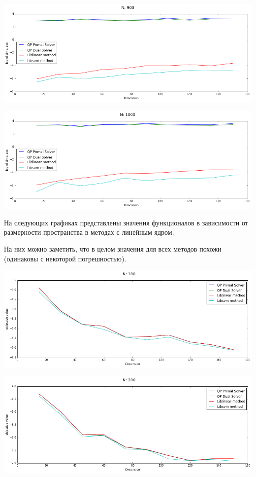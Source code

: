 \documentclass[12pt, a4paper]{article}
\begin{document}
			\begin{center}
				\includegraphics[width=17cm]{1par_N900_one.png}
			\end{center}

			\begin{center}
				\includegraphics[width=17cm]{1par_N1000_one.png}
			\end{center}

			На следующих графиках представлены значения функционалов в зависимости от размерности пространства в методах с линейным ядром.

			На них можно заметить, что в целом значения для всех методов похожи (одинаковы с некоторой погрешностью).

			\begin{center}
				\includegraphics[width=17cm]{1par_obj_N100_one.png}
			\end{center}

			\begin{center}
				\includegraphics[width=17cm]{1par_obj_N200_one.png}
			\end{center}
\end{document}
